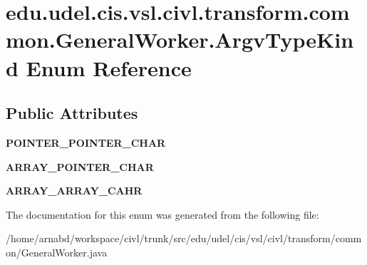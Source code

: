 \hypertarget{enumedu_1_1udel_1_1cis_1_1vsl_1_1civl_1_1transform_1_1common_1_1GeneralWorker_1_1ArgvTypeKind}{}\section{edu.\+udel.\+cis.\+vsl.\+civl.\+transform.\+common.\+General\+Worker.\+Argv\+Type\+Kind Enum Reference}
\label{enumedu_1_1udel_1_1cis_1_1vsl_1_1civl_1_1transform_1_1common_1_1GeneralWorker_1_1ArgvTypeKind}
\subsection*{Public Attributes}
\begin{DoxyCompactItemize}
\item 
\hypertarget{enumedu_1_1udel_1_1cis_1_1vsl_1_1civl_1_1transform_1_1common_1_1GeneralWorker_1_1ArgvTypeKind_aec111490492add79ab5357fb17c11328}{}{\bfseries P\+O\+I\+N\+T\+E\+R\+\_\+\+P\+O\+I\+N\+T\+E\+R\+\_\+\+C\+H\+A\+R}\label{enumedu_1_1udel_1_1cis_1_1vsl_1_1civl_1_1transform_1_1common_1_1GeneralWorker_1_1ArgvTypeKind_aec111490492add79ab5357fb17c11328}

\item 
\hypertarget{enumedu_1_1udel_1_1cis_1_1vsl_1_1civl_1_1transform_1_1common_1_1GeneralWorker_1_1ArgvTypeKind_a8e1f1568bb276974f3c2c4ed0893e472}{}{\bfseries A\+R\+R\+A\+Y\+\_\+\+P\+O\+I\+N\+T\+E\+R\+\_\+\+C\+H\+A\+R}\label{enumedu_1_1udel_1_1cis_1_1vsl_1_1civl_1_1transform_1_1common_1_1GeneralWorker_1_1ArgvTypeKind_a8e1f1568bb276974f3c2c4ed0893e472}

\item 
\hypertarget{enumedu_1_1udel_1_1cis_1_1vsl_1_1civl_1_1transform_1_1common_1_1GeneralWorker_1_1ArgvTypeKind_ad65721337ea30660a5490b06674416cb}{}{\bfseries A\+R\+R\+A\+Y\+\_\+\+A\+R\+R\+A\+Y\+\_\+\+C\+A\+H\+R}\label{enumedu_1_1udel_1_1cis_1_1vsl_1_1civl_1_1transform_1_1common_1_1GeneralWorker_1_1ArgvTypeKind_ad65721337ea30660a5490b06674416cb}

\end{DoxyCompactItemize}


The documentation for this enum was generated from the following file\+:\begin{DoxyCompactItemize}
\item 
/home/arnabd/workspace/civl/trunk/src/edu/udel/cis/vsl/civl/transform/common/General\+Worker.\+java\end{DoxyCompactItemize}
